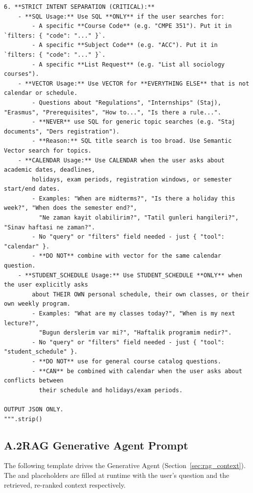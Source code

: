 \documentclass[a4paper,12pt]{article}
\renewcommand{\texttt}[1]{{\ttfamily\seqsplit{#1}}}
\begin{document}
\begin{lstlisting}[style=promptstyle]
6. **STRICT INTENT SEPARATION (CRITICAL):**
    - **SQL Usage:** Use SQL **ONLY** if the user searches for:
        - A specific **Course Code** (e.g. "CMPE 351"). Put it in `filters: { "code": "..." }`.
        - A specific **Subject Code** (e.g. "ACC"). Put it in `filters: { "code": "..." }`.
        - A specific **List Request** (e.g. "List all sociology courses").
    - **VECTOR Usage:** Use VECTOR for **EVERYTHING ELSE** that is not calendar or schedule.
        - Questions about "Regulations", "Internships" (Staj), "Erasmus", "Prerequisites", "How to...", "Is there a rule...".
        - **NEVER** use SQL for generic topic searches (e.g. "Staj documents", "Ders registration"). 
        - **Reason:** SQL title search is too broad. Use Semantic Vector search for topics.
    - **CALENDAR Usage:** Use CALENDAR when the user asks about academic dates, deadlines,
        holidays, exam periods, registration windows, or semester start/end dates.
        - Examples: "When are midterms?", "Is there a holiday this week?", "When does the semester end?",
          "Ne zaman kayit olabilirim?", "Tatil gunleri hangileri?", "Sinav haftasi ne zaman?".
        - No "query" or "filters" field needed - just { "tool": "calendar" }.
        - **DO NOT** combine with vector for the same calendar question.
    - **STUDENT_SCHEDULE Usage:** Use STUDENT_SCHEDULE **ONLY** when the user explicitly asks
        about THEIR OWN personal schedule, their own classes, or their own weekly program.
        - Examples: "What are my classes today?", "When is my next lecture?",
          "Bugun derslerim var mi?", "Haftalik programim nedir?".
        - No "query" or "filters" field needed - just { "tool": "student_schedule" }.
        - **DO NOT** use for general course catalog questions.
        - **CAN** be combined with calendar when the user asks about conflicts between
          their schedule and holidays/exam periods.

OUTPUT JSON ONLY.
""".strip()
\end{lstlisting}

\subsection*{A.2\quad RAG Generative Agent Prompt}
\label{app:answer_prompt}
The following template drives the Generative Agent (Section~\ref{sec:rag_context}). The \texttt{\{query\}} and \texttt{\{context\}} placeholders are filled at runtime with the user's question and the retrieved, re-ranked context respectively.
\end{document}
